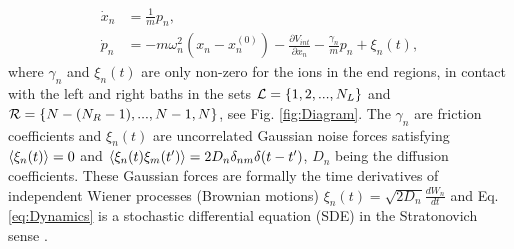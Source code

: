 %
\begin{equation}
    \begin{split}
        \dot{x}_n &= \frac{1}{m}p_n, \\
        \dot{p}_n &= - m\omega_n^2 (x_n-x_n^{(0)}) - \frac{\partial V_{int}}{\partial x_n} - \frac{\gamma_n}{m}p_n + \xi_n(t),
    \end{split}
    \label{eq:Dynamics}
\end{equation}
%
where $\gamma_n$ and $\xi_n(t)$ are only non-zero for the ions in the end regions, in contact with the left and right baths in the sets ${\cal L} = \left\{1,2,...,N_L\right\}$ and ${\cal R} = \left\{N-(N_R-1),...,N-1,N\right\}$,  see Fig. \ref{fig:Diagram}. The $\gamma_n$ are friction coefficients and $\xi_n(t)$ are uncorrelated Gaussian noise forces satisfying $\expval{ \xi_n(t)} = 0$ and $\expval{ \xi_n(t)\xi_m(t') } = 2 D_n \delta_{nm}\delta(t-t')$, $D_n$ being the diffusion coefficients. These Gaussian forces are formally the time derivatives of independent Wiener processes (Brownian motions)   $\xi_n(t) = \sqrt{2D_n}\frac{dW_n}{dt}$ \cite{Toral2014,Ruiz2014} and Eq. \eqref{eq:Dynamics} is a stochastic differential equation (SDE) in the Stratonovich sense \cite{Toral2014}.

